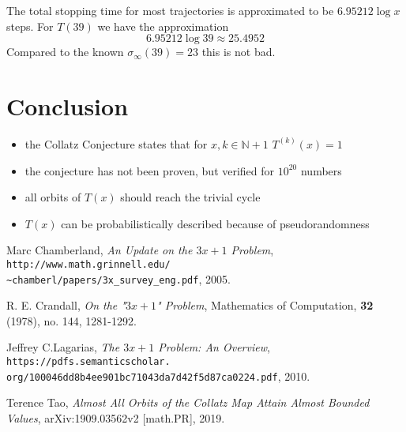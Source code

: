 \documentclass[12pt,a4paper,reqno]{amsart}
\begin{document}
The total stopping time for most trajectories is approximated to be 
$6.95212 \log x$ steps. For $T(39)$ we have the approximation
\begin{equation}\nonumber
    6.95212 \log 39 \approx 25.4952
\end{equation}
Compared to the known $\sigma_{\infty}(39)=23$ this is not bad.

\section{Conclusion}

\begin{itemize}
    \item the Collatz Conjecture states that for $x,k \in \mathbb{N} + 1$
        $T^{(k)}(x)=1$
    \item the conjecture has not been proven, but verified for $10^{20}$
        numbers
    \item all orbits of $T(x)$ should reach the trivial cycle
    \item $T(x)$ can be probabilistically described because of pseudorandomness
\end{itemize}



\begin{thebibliography}{4}

 Marc Chamberland, 
    \textit{An Update on the $3x+1$ Problem},
    \texttt{http://www.math.grinnell.edu/\\
        \~{}chamberl/papers/3x\_survey\_eng.pdf}, 2005.

 R. E. Crandall, \textit{On the "$3x+1$" Problem},
    Mathematics of Computation, \textbf{32} (1978), no. 144, 1281-1292.

 Jeffrey C.Lagarias, 
    \textit{The $3x+1$ Problem: An Overview},
    \texttt{https://pdfs.semanticscholar.\\
        org/100046dd8b4ee901bc71043da7d42f5d87ca0224.pdf}, 2010.

 Terence Tao, \textit{Almost All Orbits of the Collatz Map Attain
    Almost Bounded Values}, arXiv:1909.03562v2 [math.PR], 2019.

\end{thebibliography}
\end{document}
